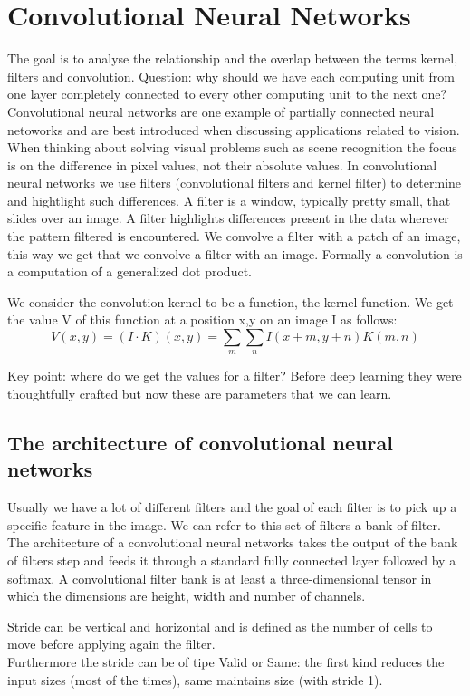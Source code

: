 \section{Convolutional Neural Networks}

The goal is to analyse the relationship and the overlap between the terms kernel, filters and convolution. Question: why should we have each computing unit from one layer completely connected to every other computing unit to the next one?\\
Convolutional neural networks are one example of partially connected neural netoworks and are best introduced when discussing applications related to vision.\\
When thinking about solving visual problems such as scene recognition the focus is on the difference in pixel values, not their absolute values. In convolutional neural networks we use filters (convolutional filters and kernel filter) to determine and hightlight such differences. A filter is a window, typically pretty small, that slides over an image. A filter highlights differences present in the data wherever the pattern filtered is encountered. We convolve a filter with a patch of an image, this way we get that we convolve a filter with an image. Formally a convolution is a computation of a generalized dot product.
\begin{definition}
    We consider the convolution kernel to be a function, the kernel function. We get the value V of this function at a position x,y on an image I as follows:
    \[ 
        V(x,y) = (I\cdot K) (x,y) = \sum_{m}{\sum_{n}{I(x+m,y+n)K(m,n)}}
    \]
\end{definition}
Key point: where do we get the values for a filter? Before deep learning they were thoughtfully crafted but now these are parameters that we can learn.
\subsection{The architecture of convolutional neural networks}
Usually we have a lot of different filters and the goal of each filter is to pick up a specific feature in the image. We can refer to this set of filters a bank of filter. The architecture of a convolutional neural networks takes the output of the bank of filters step and feeds it through a standard fully connected layer followed by a softmax. A convolutional filter bank is at least a three-dimensional tensor in which the dimensions are height, width and number of channels. 
\begin{definition}[Stride]
    Stride can be vertical and horizontal and is defined as the number of cells to move before applying again the filter.\\Furthermore the stride can be of tipe Valid or Same: the first kind reduces the input sizes (most of the times), same maintains size (with stride 1). 
\end{definition}